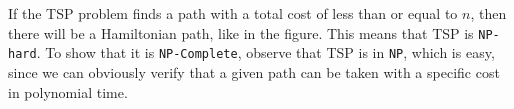 If the TSP problem finds a path with a total cost of less than or equal to $n$,
then there will be a Hamiltonian path, like in the figure. This means that TSP
is \texttt{NP-hard}. To show that it is \texttt{NP-Complete}, observe that TSP
is in \texttt{NP}, which is easy, since we can obviously verify that a given
path can be taken with a specific cost in polynomial time.
